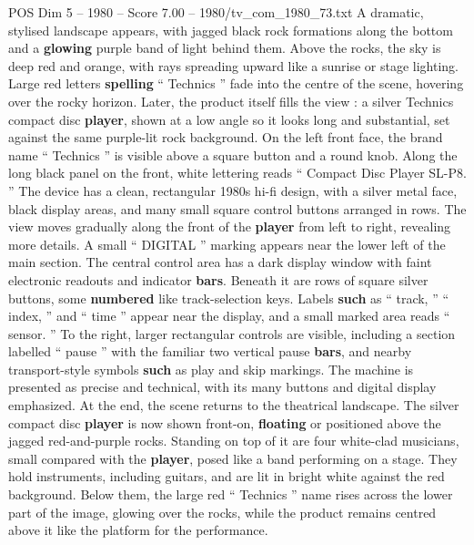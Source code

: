\begin{textsample}{POS Dim 5 – 1980 – Score 7.00 – 1980/tv\_com\_1980\_73.txt}  \label{ex:f5_pos_034}
A dramatic, stylised landscape appears, with jagged black rock formations along the bottom and a \textbf{glowing} purple band of light behind them.
Above the rocks, the sky is deep red and orange, with rays spreading upward like a sunrise or stage lighting.
Large red letters \textbf{spelling} “ Technics ” fade into the centre of the scene, hovering over the rocky horizon.
Later, the product itself fills the view : a silver Technics compact disc \textbf{player}, shown at a low angle so it looks long and substantial, set against the same purple-lit rock background.
On the left front face, the brand name “ Technics ” is visible above a square button and a round knob.
Along the long black panel on the front, white lettering reads “ Compact Disc Player SL-P8. ” The device has a clean, rectangular 1980s hi-fi design, with a silver metal face, black display areas, and many small square control buttons arranged in rows.
The view moves gradually along the front of the \textbf{player} from left to right, revealing more details.
A small “ DIGITAL ” marking appears near the lower left of the main section.
The central control area has a dark display window with faint electronic readouts and indicator \textbf{bars}.
Beneath it are rows of square silver buttons, some \textbf{numbered} like track-selection keys.
Labels \textbf{such} as “ track, ” “ index, ” and “ time ” appear near the display, and a small marked area reads “ sensor. ” To the right, larger rectangular controls are visible, including a section labelled “ pause ” with the familiar two vertical pause \textbf{bars}, and nearby transport-style symbols \textbf{such} as play and skip markings.
The machine is presented as precise and technical, with its many buttons and digital display emphasized.
At the end, the scene returns to the theatrical landscape.
The silver compact disc \textbf{player} is now shown front-on, \textbf{floating} or positioned above the jagged red-and-purple rocks.
Standing on top of it are four white-clad musicians, small compared with the \textbf{player}, posed like a band performing on a stage.
They hold instruments, including guitars, and are lit in bright white against the red background.
Below them, the large red “ Technics ” name rises across the lower part of the image, glowing over the rocks, while the product remains centred above it like the platform for the performance.

\end{textsample}
